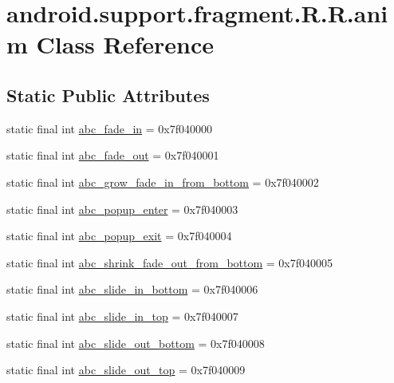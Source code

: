 \hypertarget{classandroid_1_1support_1_1fragment_1_1_r_1_1anim}{
\section{android.support.fragment.R.R.anim Class Reference}
\label{classandroid_1_1support_1_1fragment_1_1_r_1_1anim}
}
\subsection*{Static Public Attributes}
\begin{CompactItemize}
\item 
static final int \hyperlink{classandroid_1_1support_1_1fragment_1_1_r_1_1anim_8e5f1a0131d7980ff6dcc2ba6da9fcda}{abc\_\-fade\_\-in} = 0x7f040000
\item 
static final int \hyperlink{classandroid_1_1support_1_1fragment_1_1_r_1_1anim_780f1f65647cd9bd5fbda0c47f3d12c1}{abc\_\-fade\_\-out} = 0x7f040001
\item 
static final int \hyperlink{classandroid_1_1support_1_1fragment_1_1_r_1_1anim_63e44f420497645dc1a5554984273c92}{abc\_\-grow\_\-fade\_\-in\_\-from\_\-bottom} = 0x7f040002
\item 
static final int \hyperlink{classandroid_1_1support_1_1fragment_1_1_r_1_1anim_5a04bf36f644f39803b5536e14774397}{abc\_\-popup\_\-enter} = 0x7f040003
\item 
static final int \hyperlink{classandroid_1_1support_1_1fragment_1_1_r_1_1anim_c2884bc66cf87894b1c05ee9229fe62e}{abc\_\-popup\_\-exit} = 0x7f040004
\item 
static final int \hyperlink{classandroid_1_1support_1_1fragment_1_1_r_1_1anim_691cfbbfd207aeb995ff52bf8eb09138}{abc\_\-shrink\_\-fade\_\-out\_\-from\_\-bottom} = 0x7f040005
\item 
static final int \hyperlink{classandroid_1_1support_1_1fragment_1_1_r_1_1anim_e888f7955fbc443eac07c2a0b958db64}{abc\_\-slide\_\-in\_\-bottom} = 0x7f040006
\item 
static final int \hyperlink{classandroid_1_1support_1_1fragment_1_1_r_1_1anim_c35e673527da451853c654dc286d0f1a}{abc\_\-slide\_\-in\_\-top} = 0x7f040007
\item 
static final int \hyperlink{classandroid_1_1support_1_1fragment_1_1_r_1_1anim_0486cd2b70f7853628d6af81adb16a61}{abc\_\-slide\_\-out\_\-bottom} = 0x7f040008
\item 
static final int \hyperlink{classandroid_1_1support_1_1fragment_1_1_r_1_1anim_00b8449889d8dc0c99ee7c4522b8a877}{abc\_\-slide\_\-out\_\-top} = 0x7f040009

\end{CompactItemize}
